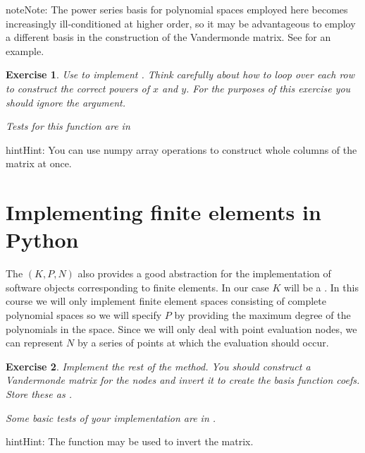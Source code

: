 \documentclass{book}
\newtheorem{exercise}{Exercise}
\begin{document}
\begin{sphinxadmonition}{note}{Note:}
The power series basis for polynomial spaces employed here becomes
increasingly ill-conditioned at higher order, so it may be
advantageous to employ a different basis in the construction of the
Vandermonde matrix. See \label{\detokenize{2_finite_elements:id4}}{\hyperref[\detokenize{zbibliography:kirby2004}]{\sphinxcrossref{{[}Kir04{]}}}} for an example.
\end{sphinxadmonition}
\label{\detokenize{2_finite_elements:ex-vandermonde}}
\begin{exercise}
Use {\hyperref[\detokenize{2_finite_elements:equation-Vandermonde}]{}} to implement
. Think
carefully about how to loop over each row to construct the correct
powers of \(x\) and \(y\). For the purposes of this exercise you should
ignore the  argument.

Tests for this function are in 
\end{exercise}
\begin{sphinxadmonition}{hint}{Hint:}
You can use numpy array operations to construct whole columns of
the matrix at once.
\end{sphinxadmonition}


\section{Implementing finite elements in Python}
\label{\detokenize{2_finite_elements:implementing-finite-elements-in-python}}
The {\hyperref[\detokenize{2_finite_elements:def-ciarlet}]{}} \((K, P, N)\) also provides a
good abstraction for the implementation of software objects
corresponding to finite elements. In our case \(K\) will be a
. In this course we
will only implement finite element spaces consisting of complete
polynomial spaces so we will specify \(P\) by providing the maximum
degree of the polynomials in the space. Since we will only deal with
point evaluation nodes, we can represent \(N\) by a series of points at
which the evaluation should occur.

\label{\detokenize{2_finite_elements:ex-finite-element}}
\begin{exercise}
Implement the rest of the
 
method. You should construct a Vandermonde matrix for the nodes and
invert it to create the basis function coefs. Store these as
.

Some basic tests of your implementation are in
.
\end{exercise}
\begin{sphinxadmonition}{hint}{Hint:}
The  function may be
used to invert the matrix.
\end{sphinxadmonition}
\end{document}
